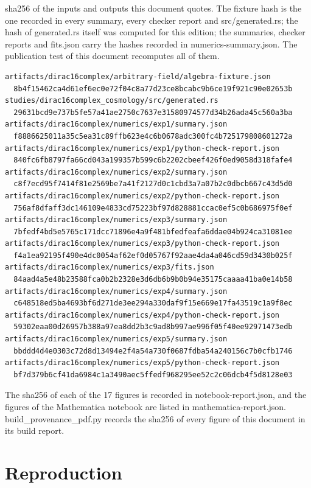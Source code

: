 \documentclass[11pt]{article}
\begin{document}
sha256 of the inputs and outputs this document quotes. The fixture hash is the one recorded in every summary, every checker report and src/generated.rs; the hash of generated.rs itself was computed for this edition; the summaries, checker reports and fits.json carry the hashes recorded in numerics-summary.json. The publication test of this document recomputes all of them.

\begin{Verbatim}[fontsize=\small]
artifacts/dirac16complex/arbitrary-field/algebra-fixture.json
  8b4f15462ca4d61ef6ec0e72f04c8a77d23ce8bcabc9b6ce19f921c90e02653b
studies/dirac16complex_cosmology/src/generated.rs
  29631bcd9e737b5fe57a41ae2750c7637e31580974577d34b26ada45c560a3ba
artifacts/dirac16complex/numerics/exp1/summary.json
  f8886625011a35c5ea31c89ffb623e4c6b0678adc300fc4b725179808601272a
artifacts/dirac16complex/numerics/exp1/python-check-report.json
  840fc6fb8797fa66cd043a199357b599c6b2202cbeef426f0ed9058d318fafe4
artifacts/dirac16complex/numerics/exp2/summary.json
  c8f7ecd95f7414f81e2569be7a41f2127d0c1cbd3a7a07b2c0dbcb667c43d5d0
artifacts/dirac16complex/numerics/exp2/python-check-report.json
  756af8dfaff3dc146109e4833cd75223bf97d828881ccac0ef5c0b686975f0ef
artifacts/dirac16complex/numerics/exp3/summary.json
  7bfedf4bd5e5765c171dcc71896e4a9f481bfedfeafa6ddae04b924ca31081ee
artifacts/dirac16complex/numerics/exp3/python-check-report.json
  f4a1ea92195f490e4dc0054af62ef0d05767f92aae4da4a046cd59d3430b025f
artifacts/dirac16complex/numerics/exp3/fits.json
  84aad4a5e48b23588fca0b2b2328e3d6db6b9b0b94e35175caaaa41ba0e14b58
artifacts/dirac16complex/numerics/exp4/summary.json
  c648518ed5ba4693bf6d271de3ee294a330daf9f15e669e17fa43519c1a9f8ec
artifacts/dirac16complex/numerics/exp4/python-check-report.json
  59302eaa00d26957b388a97ea8dd2b3c9ad8b997ae996f05f40ee92971473edb
artifacts/dirac16complex/numerics/exp5/summary.json
  bbddd4d4e0303c72d8d13494e2f4a54a730f0687fdba54a240156c7b0cfb1746
artifacts/dirac16complex/numerics/exp5/python-check-report.json
  bf7d379b6cf41da6984c1a3490aec5ffedf968295ee52c2c06dcb4f5d8128e03
\end{Verbatim}

The sha256 of each of the 17 figures is recorded in notebook-report.json, and the figures of the Mathematica notebook are listed in mathematica-report.json. build\_provenance\_pdf.py records the sha256 of every figure of this document in its build report.

\section{Reproduction}
\end{document}
